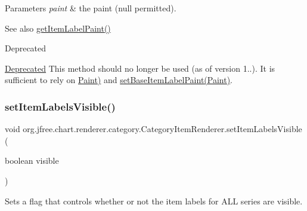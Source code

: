 \begin{DoxyParams}{Parameters}
{\em paint} & the paint ({\ttfamily null} permitted).\\
\hline
\end{DoxyParams}
\begin{DoxySeeAlso}{See also}
\mbox{\hyperlink{interfaceorg_1_1jfree_1_1chart_1_1renderer_1_1category_1_1_category_item_renderer_a78f5ae7abb9e7c55826dc6009ceb7839}{get\+Item\+Label\+Paint()}}
\end{DoxySeeAlso}
\begin{DoxyRefDesc}{Deprecated}
\item[\mbox{\hyperlink{deprecated__deprecated000173}{Deprecated}}]This method should no longer be used (as of version 1..). It is sufficient to rely on \mbox{\hyperlink{}{Paint)}} and \mbox{\hyperlink{interfaceorg_1_1jfree_1_1chart_1_1renderer_1_1category_1_1_category_item_renderer_a51d5ebfa3ec0fa1b1ed5ab9ac945c211}{set\+Base\+Item\+Label\+Paint(\+Paint)}}. \end{DoxyRefDesc}
\mbox{\label{interfaceorg_1_1jfree_1_1chart_1_1renderer_1_1category_1_1_category_item_renderer_af9ce871487627fca00bd5b7b4ddc6306}} 
\subsubsection{\texorpdfstring{set\+Item\+Labels\+Visible()}{setItemLabelsVisible()}\hspace{0.1cm}{\footnotesize\ttfamily [1/3]}}
{\footnotesize\ttfamily void org.\+jfree.\+chart.\+renderer.\+category.\+Category\+Item\+Renderer.\+set\+Item\+Labels\+Visible (\begin{DoxyParamCaption}\item[{boolean}]{visible }\end{DoxyParamCaption})}

Sets a flag that controls whether or not the item labels for A\+LL series are visible.


